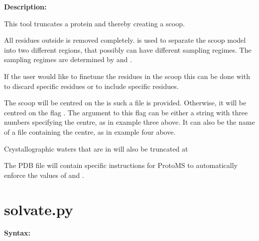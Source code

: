 \documentclass[letterpaper,10pt,english]{sphinxmanual}
\begin{document}
\textbf{Description:}

This tool truncates a protein and thereby creating a scoop.

All residues outside  is removed completely.  is used to separate the scoop model into two different regions, that possibly can have different sampling regimes. The sampling regimes are determined by  and .

If the user would like to finetune the residues in the scoop this can be done with  to discard specific residues or  to include specific residues.

The scoop will be centred on the  is such a file is provided. Otherwise, it will be centred on the flag . The argument to this flag can be either a string with three numbers specifying the centre, as in example three above. It can also be the name of a file containing the centre, as in example four above.

Crystallographic waters that are in  will also be truncated at 

The PDB file will contain specific instructions for ProtoMS to automatically enforce the values of   and .


\section{solvate.py}
\label{tools:solvate-py}
\textbf{Syntax:}
\end{document}
